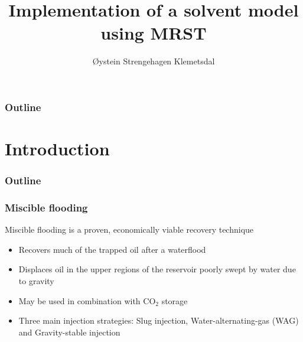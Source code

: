 \documentclass[screen, aspectratio=43]{beamer}
\title[Short title]{Implementation of a solvent model using MRST}
\author[Ø.S. Klemetsdal]{Øystein Strengehagen Klemetsdal}
\institute[NTNU]{Department of Mathematical sciences, NTNU}
\date{} %
\begin{document}
\ntnutitlepage

\begin{frame}
  \frametitle{Outline}
  \tableofcontents
\end{frame}

\section{Introduction}

\begin{frame}
  \frametitle{Outline}
  \tableofcontents[currentsection]
\end{frame}


\begin{frame}
  \frametitle{Miscible flooding}
  Miscible flooding is a proven, economically viable recovery technique \cite{petroWiki2017Misc}
  \begin{itemize}
  \item Recovers much of the trapped oil after a waterflood
  \item Displaces oil in the upper regions of the reservoir poorly swept by water due
    to gravity
  \item May be used in combination with CO$_2$ storage
  \item Three main injection strategies: Slug injection, Water-alternating-gas (WAG) and
    Gravity-stable injection
  \end{itemize}
  \begin{figure}[h]
    \centering
    \hspace{1em}
  \end{figure}
\end{frame}
\end{document}

